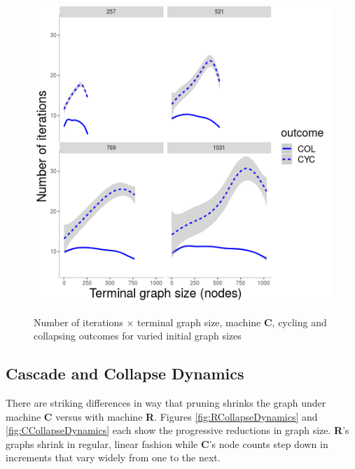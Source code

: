 \documentclass{tufte-handout}
\begin{document}
{\begin{figure}
\centering
  \includegraphics{nriter-x-finnn-smooth.png} \\
  \caption{Number of iterations $\times$ terminal graph size, machine \textbf{C},
cycling and collapsing outcomes for varied initial graph sizes}
  \label{fig:NriterXFinnn}
\end{figure}

\subsection{Cascade and Collapse Dynamics}

There are striking differences in way that pruning shrinks the graph
under machine \textbf{C} versus with machine \textbf{R}.
Figures \ref{fig:RCollapseDynamics} and \ref{fig:CCollapseDynamics} each
show the progressive reductions in graph size. \textbf{R}'s graphs
shrink in regular, linear fashion while \textbf{C}'s node counts
step down in increments that vary widely from one to the next.

}
\end{document}
